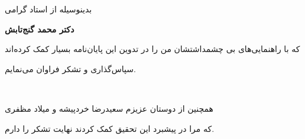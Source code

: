 \begin{Thanks_to}

\vspace{6mm}
\centerline{\Nastaliq \huge بدینوسیله از استاد گرامی  }
\vspace{6mm}
\centerline{\Nastaliq \huge {\bf دکتر محمد گنج‌تابش}  }
\vspace{6mm}
\centerline{\Nastaliq \huge که با راهنمایی‌های بی چشمداشتشان من را در تدوین این پایان‌نامه بسیار کمک کرده‌اند  }
\vspace{6mm}
\centerline{\Nastaliq \huge  سپاس‌گذاری و تشکر فراوان می‌نمایم. }

 ‌
 \vspace{35pt}

\centerline{\Nastaliq \LARGE همچنین از دوستان عزیزم سعیدرضا خردپیشه و میلاد مظفری }

\centerline{\Nastaliq \LARGE  که مرا در پیشبرد این تحقیق کمک کردند نهایت تشکر را دارم. }

\noindent


\end{Thanks_to}